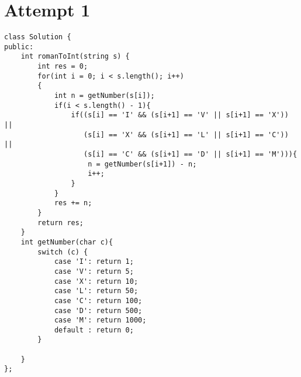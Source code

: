 \section{Attempt 1}
\begin{lstlisting}
class Solution {
public:
    int romanToInt(string s) {
        int res = 0;
        for(int i = 0; i < s.length(); i++)
        {
            int n = getNumber(s[i]);
            if(i < s.length() - 1){
                if((s[i] == 'I' && (s[i+1] == 'V' || s[i+1] == 'X')) || 
                   (s[i] == 'X' && (s[i+1] == 'L' || s[i+1] == 'C')) || 
                   (s[i] == 'C' && (s[i+1] == 'D' || s[i+1] == 'M'))){
                    n = getNumber(s[i+1]) - n;
                    i++;
                }
            }
            res += n;
        }
        return res;
    }
    int getNumber(char c){
        switch (c) {
            case 'I': return 1;
            case 'V': return 5;
            case 'X': return 10;
            case 'L': return 50;
            case 'C': return 100;
            case 'D': return 500;
            case 'M': return 1000;
            default : return 0;
        }
    
    }
};
\end{lstlisting}
